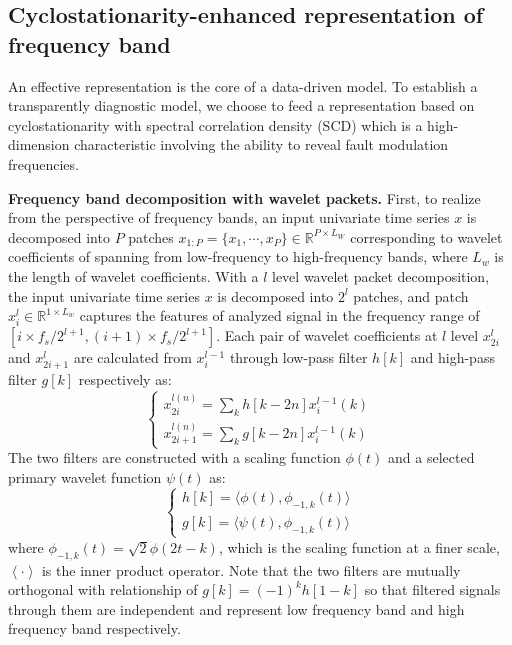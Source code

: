 \documentclass{article}
\begin{document}
	\subsection{Cyclostationarity-enhanced representation of frequency band}
	An effective representation is the core of a data-driven model. To establish a transparently diagnostic model, we choose to feed a representation based on cyclostationarity with spectral correlation density (SCD) which is a high-dimension characteristic involving the ability to reveal fault modulation frequencies.
	
	\textbf{Frequency band decomposition with wavelet packets.} First, to realize from the perspective of frequency bands, an input univariate time series $x$ is decomposed into $P$ patches $x_{1:P}=\{x_{1},\cdots,x_{P}\}\in\mathbb{R}^{P\times L_{W}}$ corresponding to wavelet coefficients of spanning from low-frequency to high-frequency bands, where $L_{w}$ is the length of wavelet coefficients. With a $l$ level wavelet packet decomposition, the input univariate time series $x$ is decomposed into $2^{l}$ patches, and patch $x_{i}^{l}\in\mathbb{R}^{1\times L_{w}}$ captures the features of analyzed signal in the frequency range of $[i\times f_{s}/2^{l+1},(i+1)\times f_{s}/2^{l+1}]$. Each pair of wavelet coefficients at $l$ level $x_{2i}^{l}$ and $x_{2i+1}^{l}$ are calculated from $x_{i}^{l-1}$ through low-pass filter $h[k]$ and high-pass filter $g[k]$ respectively as:
	\begin{equation}
		\begin{cases}
			x_{2i}^{l(n)}=\sum_{k}h[k-2n]x_{i}^{l-1}(k) \\
			x_{2i+1}^{l(n)}=\sum_{k}g[k-2n]x_{i}^{l-1}(k)
		\end{cases}
	\end{equation}
	The two filters are constructed with a scaling function $\phi(t)$ and a selected primary wavelet function $\psi(t)$ as:
	\begin{equation}
		\begin{cases}
			h[k]=\langle\phi(t),\phi_{-1,k}(t)\rangle \\
			g[k]=\langle\psi(t),\phi_{-1,k}(t)\rangle
		\end{cases}
	\end{equation}
	where $\phi_{-1,k}(t)=\sqrt{2}\phi(2t-k)$, which is the scaling function at a finer scale, $\left\langle\cdot\right\rangle$ is the inner product operator. Note that the two filters are mutually orthogonal with relationship of $g[k]=(-1)^{k}h[1-k]$ so that filtered signals through them are independent and represent low frequency band and high frequency band respectively.
	
\end{document}
